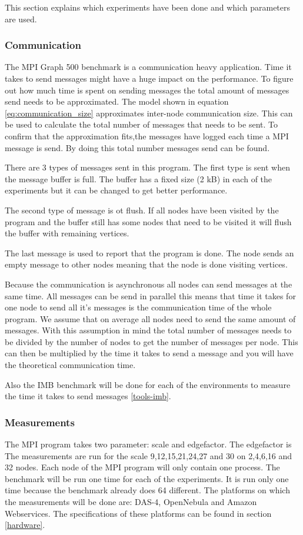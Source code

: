 This section explains which experiments have been done and which parameters are used.

\subsubsection{Communication}
\label{med:comm}
The MPI Graph 500 benchmark is a communication heavy application. Time it takes to send messages might have a huge impact on the performance. To figure out how much time is spent on sending messages the total amount of messages send needs to be approximated. The model shown in equation \ref{eq:communication_size} approximates inter-node communication size. This can be used to calculate the total number of messages that needs to be sent. To confirm that the approximation fits,the messages have logged each time a MPI message is send. By doing this total number messages send can be found. 

There are 3 types of messages sent in this program. The first type is sent when the message buffer is full. The buffer has a fixed size (2 kB) in each of the experiments but it can be changed to get better performance. 

The second type of message is ot flush. If all nodes have been visited by the program and the buffer still has some nodes that need to be visited it will flush the buffer with remaining vertices.

The last message is used to report that the program is done. The node sends an empty message to other nodes meaning that the node is done visiting vertices.

Because the communication is asynchronous all nodes can send messages at the same time. All messages can be send in parallel this means that time it takes for one node to send all it's messages is the communication time of the whole program. We assume that on average all nodes need to send the same amount of messages. With this assumption in mind the total number of messages needs to be divided by the number of nodes to get the number of messages per node. This can then be multiplied by the time it takes to send a message and you will have the theoretical communication time.  

Also the IMB benchmark will be done for each of the environments to measure the time it takes to send messages \ref{tools-imb}.


\subsubsection{Measurements}
The MPI program takes two parameter: scale and edgefactor. The edgefactor is The measurements are run for the scale 9,12,15,21,24,27 and 30 on 2,4,6,16 and 32 nodes. Each node of the MPI program will only contain one process. The benchmark will be run one time for each of the experiments. It is run only one time because the benchmark already does 64 different. The platforms on which the measurements will be done are: DAS-4, OpenNebula and Amazon Webservices. The specifications of these platforms can be found in section \ref{hardware}.


